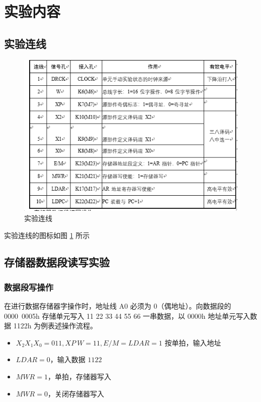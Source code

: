 \documentclass[a4paper,10pt,UTF8]{paper}
\numberwithin{equation}{section}
\numberwithin{figure}{section}
\begin{document}
\section{实验内容}
\subsection{实验连线}

\begin{figure}[h]
    \centering
    \includegraphics[width=0.8\linewidth]{1.PNG}
    \caption{实验连线}
    \label{fig:1}
\end{figure}

实验连线的图标如图 \ref{fig:1} 所示

\subsection{存储器数据段读写实验}

\subsubsection{数据段写操作}

在进行数据存储器字操作时，地址线 A0 必须为 0（偶地址）。向数据段的 0000~0005h 存储单元写入 11 22 33 44 55 66 一串数据，以 0000h 地址单元写入数据 1122h 为例表述操作流程。

\begin{itemize}
    \item $X_2X_1X_0=011, XP\ W=11,E/M=LDAR=1$ 按单拍，输入地址
    \item $LDAR=0$，输入数据 $1122$
    \item $MWR=1$，单拍，存储器写入
    \item $MWR=0$，关闭存储器写入
\end{itemize}
\end{document}
